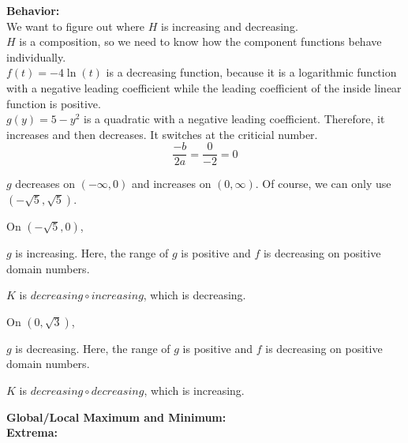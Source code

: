 \documentclass{ximera}
\begin{document}
\textbf{\textcolor{blue!55!black}{Behavior:}} \\


We want to figure out where $H$ is increasing and decreasing. \\

$H$ is a composition, so we need to know how the component functions behave individually. \\





$f(t) = -4 \ln(t)$ is a decreasing function, because it is a logarithmic function with a negative leading coefficient while the leading coefficient of the inside linear function is  positive. \\

$g(y) = 5 - y^2$ is a quadratic with a negative leading coefficient.  Therefore, it increases and then decreases.   It switches at the criticial number.\\



\[
\frac{-b}{2 a} = \frac{0}{-2} = 0
\]


$g$ decreases on $(-\infty, 0)$ and increases on $(0, \infty)$.  Of course, we can only use $(-\sqrt{5}, \sqrt{5})$.





On $(-\sqrt{5}, 0)$, 


$g$ is increasing. Here, the range of $g$ is positive and $f$ is decreasing on positive domain numbers.

\begin{center}
$K$ is $decreasing \circ increasing$, which is decreasing. \\
\end{center}




On $(0, \sqrt{3})$, 


$g$ is decreasing. Here, the range of $g$ is positive and $f$ is decreasing on positive domain numbers.


\begin{center}
$K$ is $decreasing \circ decreasing$, which is increasing. \\
\end{center}







\textbf{\textcolor{blue!55!black}{Global/Local Maximum and Minimum:}} \\
\textbf{Extrema:} \\
\end{document}
